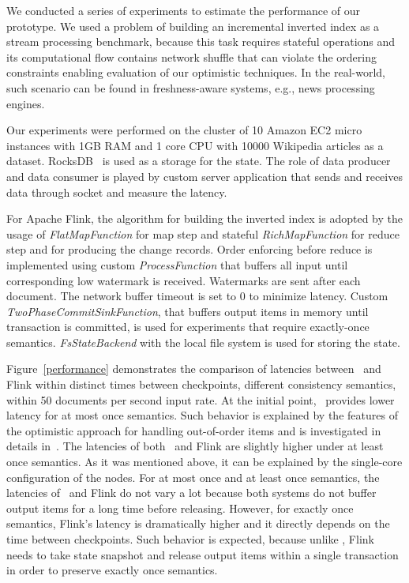 \label {fs-short-experiments}

We conducted a  series of experiments to estimate the performance of our  prototype. We used a problem of building an incremental inverted index as a stream processing benchmark, because this task requires stateful operations and its computational flow contains network shuffle that can violate the ordering constraints enabling evaluation of our optimistic techniques. In the real-world, such scenario can be found in freshness-aware systems, e.g., news processing engines.

Our experiments were performed on the cluster of 10 Amazon EC2 micro instances with 1GB RAM and 1 core CPU with 10000 Wikipedia articles as a dataset. RocksDB~\cite{rocksdb} is used as a storage for the state. The role of data producer and data consumer is played by custom server application that sends and receives data through socket and measure the latency.

For Apache Flink, the algorithm for building the inverted index is adopted by the usage of {\it FlatMapFunction} for map step and stateful {\it RichMapFunction} for reduce step and for producing the change records. Order enforcing before reduce is implemented using custom {\it ProcessFunction} that buffers all input until corresponding low watermark is received. Watermarks are sent after each document. The network buffer timeout is set to 0 to minimize latency. Custom {\it TwoPhaseCommitSinkFunction}, that buffers output items in memory until transaction is committed, is used for experiments that require exactly-once semantics. {\it FsStateBackend} with the local file system is used for storing the state.

Figure~\ref{performance} demonstrates the comparison of latencies between \FlameStream\ and Flink within distinct times between checkpoints, different consistency semantics, within 50 documents per second input rate. At the initial point, \FlameStream\ provides lower latency for at most once semantics. Such behavior is explained by the features of the optimistic approach for handling out-of-order items and is investigated in details in~\cite{we2018seim}. The latencies of both \FlameStream\ and Flink are slightly higher under at least once semantics. As it was mentioned above, it can be explained by the single-core configuration of the nodes. For at most once and at least once semantics, the latencies of \FlameStream\ and Flink do not vary a lot because both systems do not buffer output items for a long time before releasing. However, for exactly once semantics, Flink's latency is dramatically higher and it directly depends on the time between checkpoints. Such behavior is expected, because unlike \FlameStream, Flink needs to take state snapshot and release output items within a single transaction in order to preserve exactly once semantics.

